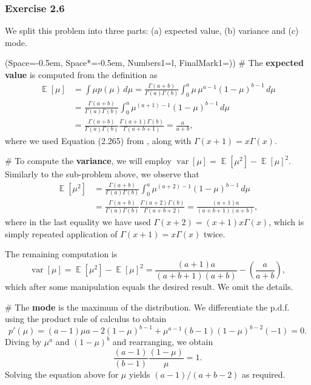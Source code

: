 \documentclass[12pt, a4paper]{article}
\newcommand{\listSpace}{-0.5em}%
\DeclareMathOperator{\E}{\mathbb{E}}
\DeclareMathOperator{\var}{\operatorname{var}}
\begin{document}
\subsubsection*{Exercise 2.6}
We split this problem into three parts: (a) expected value, (b) variance and (c) mode.
\begin{easylist}[enumerate]
	\ListProperties(Space=\listSpace, Space*=\listSpace, Numbers1=l, FinalMark1={)})
	# The \textbf{expected value} is computed from the definition as
	\begin{align*}
		\E[\mu] &= \int \mu p(\mu) \, d\mu =  \frac{\Gamma(a + b)}{\Gamma(a ) \Gamma( b)} \int_0^a \mu \, \mu^{a-1} (1- \mu)^{b-1} \, d\mu \\
		&= \frac{\Gamma(a + b)}{\Gamma(a ) \Gamma( b)} \int_0^a  \mu^{(a+1)-1} (1- \mu)^{b-1} \, d\mu \tag{re-cast as Beta} \\ 
		&= \frac{\Gamma(a + b)}{\Gamma(a ) \Gamma( b)} \frac{\Gamma(a +1 ) \Gamma( b)}{\Gamma(a + b + 1)} = \frac{a}{a + b},
	\end{align*}
	where we used Equation (2.265) from \cite{bishop_pattern_2011}, along with $\Gamma(x+1) = x\Gamma(x)$.
	
	# To compute the \textbf{variance}, we will employ $\var[\mu] = \E[\mu^2] - \E[\mu]^2$.
	Similarly to the sub-problem above, we observe that
	\begin{align*}
	\E[\mu^2] &= \frac{\Gamma(a + b)}{\Gamma(a ) \Gamma( b)} \int_0^a  \mu^{(a+2)-1} (1- \mu)^{b-1} \, d\mu \\
	&= \frac{\Gamma(a + b)}{\Gamma(a ) \Gamma( b)} \frac{\Gamma(a +2 ) \Gamma( b)}{\Gamma(a + b + 2)}
	= \frac{(a+1) a}{(a + b +1) (a+b)},
	\end{align*}
	where in the last equality we have used $\Gamma(x+2) = (x+1)x \Gamma(x)$, which is simply repeated application of $\Gamma(x+1) = x\Gamma(x)$ twice.
	
	The remaining computation is
	\begin{equation*}
		\var[\mu] = \E[\mu^2] - \E[\mu]^2 = \frac{(a+1) a}{(a + b +1) (a+b)} - \left( \frac{a}{a + b} \right),
	\end{equation*}
	which after some manipulation equals the desired result.
	We omit the details.
	
	# The \textbf{mode} is the maximum of the distribution.
	We differentiate the p.d.f. using the product rule of calculus to obtain
	\begin{equation*}
		p'(\mu) = (a-1) \mu{a-2} (1-\mu)^{b-1}
		+
		\mu^{a-1} (b-1) (1-\mu)^{b-2}(-1) = 0.
	\end{equation*}
	Diving by $\mu^a$ and $(1-\mu)^b$ and rearranging, we obtain
	\begin{equation*}
		\frac{(a-1)}{(b-1)} \frac{(1 - \mu)}{\mu} = 1.
	\end{equation*}
	Solving the equation above for $\mu$ yields  $(a-1) / (a + b - 2)$ as required.
\end{easylist}
\end{document}
